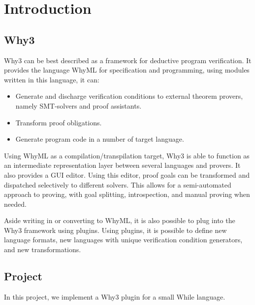 \section{Introduction} %

\subsection{Why3}
Why3 can be best described as a framework for deductive program verification.
It provides the language WhyML for specification and programming,
using modules written in this language, it can:
\begin{itemize}
    \item Generate and discharge verification conditions to external theorem provers,
        namely SMT-solvers and proof assistants.
    \item Transform proof obligations.
    \item Generate program code in a number of target language.
\end{itemize}

Using WhyML as a compilation/transpilation target,
Why3 is able to function as an intermediate representation layer
between several languages and provers.
It also provides a GUI editor.
Using this editor, proof goals can be transformed and dispatched selectively to different solvers.
This allows for a semi-automated approach to proving,
with goal splitting, introspection, and manual proving when needed.

Aside writing in or converting to WhyML,
it is also possible to plug into the Why3 framework using plugins.
Using plugins, it is possible to define new language formats,
new languages with unique verification condition generators,
and new transformations.

\subsection{Project}
In this project, we implement a Why3 plugin for a small While language.
